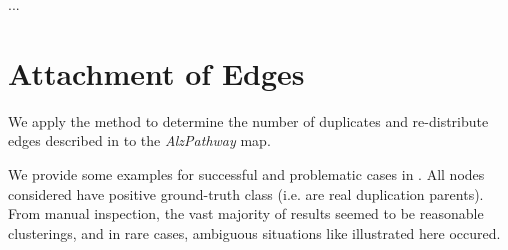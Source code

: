 \documentclass[
	fontsize=10pt, %
	twoside=false, %
	secnumdepth=1, %
  toc=indentunnumbered %
]{kaobook}
\begin{document}
...


\section{Attachment of Edges}



We apply the method to determine the number of duplicates and re-distribute
edges described in  to the \textit{AlzPathway} map.

We provide some examples for successful and problematic cases in
. All nodes considered have positive
ground-truth class (i.e. are real duplication parents). From manual inspection,
the vast majority of results seemed to be reasonable clusterings, and in rare
cases, ambiguous situations like illustrated here occured.

\end{document}
